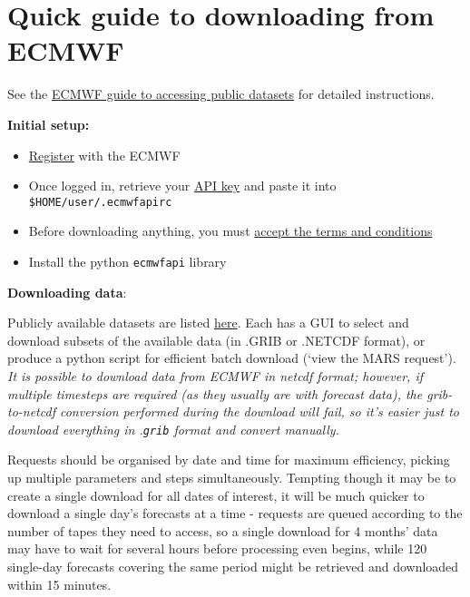 \documentclass[10pt,fleqn]{article}
\begin{document}
\section{Quick guide to downloading from ECMWF}

See the \href{https://software.ecmwf.int/wiki/display/WEBAPI/Access+ECMWF+Public+Datasets}{ECMWF guide to accessing public datasets} for detailed  instructions.

\textbf{Initial setup:}

\begin{itemize}

\item \href{https://apps.ecmwf.int/registration/}{Register} with the ECMWF

\item Once logged in, retrieve your \href{https://api.ecmwf.int/v1/key/}{API key} and paste it into \texttt{\$HOME/user/.ecmwfapirc}

\item Before downloading anything, you must \href{http://apps.ecmwf.int/datasets/data/interim-full-daily/licence/}{accept the terms and conditions}
\item Install the python \texttt{ecmwfapi} library \\[5pt]
\end{itemize}

\vspace{10pt}
\textbf{Downloading data}:

Publicly available datasets are listed \href{http://apps.ecmwf.int/datasets/}{here}. Each has a GUI to select and download subsets of the available data (in .GRIB or .NETCDF format), or produce a python script for efficient batch download (`view the MARS request'). \textit{It is possible to download data from ECMWF in netcdf format; however, if multiple timesteps are required (as they usually are with forecast data), the grib-to-netcdf conversion performed during the download will fail, so it's easier just to download everything in .\texttt{grib} format and convert manually.}

Requests should be organised by date and time for maximum efficiency, picking up multiple parameters and steps simultaneously. Tempting though it may be to create a single download for all dates of interest, it will be much quicker to download a single day's forecasts at a time - requests are queued according to the number of tapes they need to access, so a single download for 4 months' data may have to wait for several hours before processing even begins, while 120 single-day forecasts covering the same period might be retrieved and downloaded within 15 minutes.
 
\end{document}
